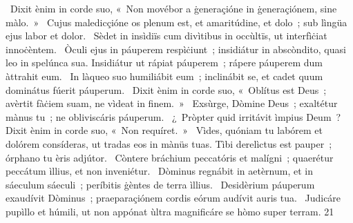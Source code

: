 {~Dixit ènim in corde suo, «~Non movébor a ġeneraçióne in ġeneraçiónem, sine màlo.~»
~Cujus maledicçióne os plenum est, et amaritúdine, et dolo~; sub lìngüa ejus labor et dolor.
~Sèdet in insìdiïs cum divìtibus in occùltïs, ut interfìċiat innoċèntem.
~Òculi ejus in páuperem respìċiunt~; insidiátur in abscòndito, quasi leo in spelúnca sua. Insidiátur ut rápiat páuperem~; rápere páuperem dum àttrahit eum.
~In làqueo suo humiliábit eum~; inclinábit se, et cadet quum dominátus fúerit páuperum.
~Dixit ènim in corde suo, «~Oblítus est Deus~; avèrtit fàċiem suam, ne vìdeat in finem.~»
~Exsùrge, Dòmine Deus~; exaltétur mànus tu~; ne obliviscáris páuperum.
~¿~Pròpter quid irritávit ìmpius Deum~? Dixit ènim in corde suo, «~Non requíret.~»
~Vìdes, quóniam tu labórem et dolórem consíderas, ut tradas eos in mànüs tuas. Tìbi derelìctus est pauper~; órphano tu èris adjútor.
~Còntere bráchium peccatóris et malígni~; quaerétur peccátum ìllius, et non inveniétur.
~Dòminus regnábit in aetèrnum, et in sáeculum sáeculi~; períbitis ġèntes de terra ìllius.
~Desidèrium páuperum exaudívit Dòminus~; praeparaçiónem cordis eórum audívit auris tua.
~Judicáre pupìllo et húmili, ut non appónat ùltra magnificáre se hòmo super terram.}
{2}{1}
